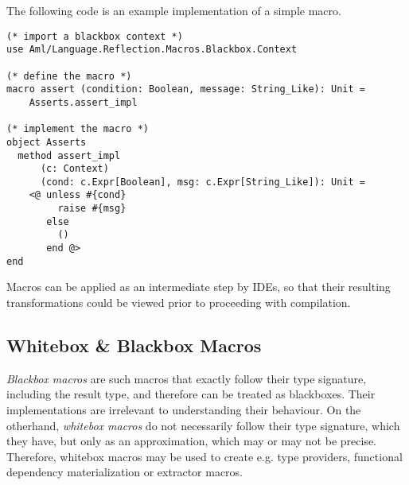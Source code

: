 \example The following code is an example implementation of a simple  macro. 
\begin{lstlisting}[deletekeywords={message,assert}]
(* import a blackbox context *)
use Aml/Language.Reflection.Macros.Blackbox.Context

(* define the macro *)
macro assert (condition: Boolean, message: String_Like): Unit = 
    Asserts.assert_impl

(* implement the macro *)
object Asserts
  method assert_impl 
      (c: Context)
      (cond: c.Expr[Boolean], msg: c.Expr[String_Like]): Unit =
    <@ unless #{cond}
         raise #{msg}
       else
         ()
       end @>
end
\end{lstlisting}

Macros can be applied as an intermediate step by IDEs, so that their resulting transformations could be viewed prior to proceeding with compilation. 





\subsection{Whitebox \& Blackbox Macros}
\label{sec:whitebox-blackbox-macros}

{\em Blackbox macros} are such macros that exactly follow their type signature, including the result type, and therefore can be treated as blackboxes. Their implementations are irrelevant to understanding their behaviour. On the otherhand, {\em whitebox macros} do not necessarily follow their type signature, which they have, but only as an approximation, which may or may not be precise. Therefore, whitebox macros may be used to create e.g. type providers, functional dependency materialization or extractor macros. 

